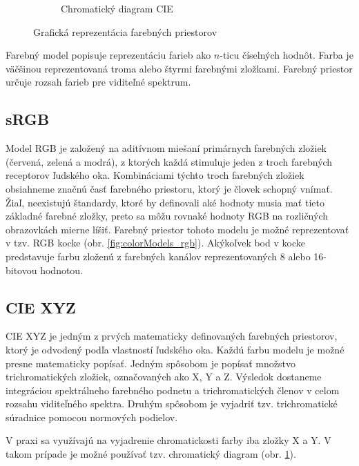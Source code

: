 \begin{figure}[t]
\begin{subfigure}{0.35\textwidth}
        \caption{Chromatický diagram CIE}
        \label{fig:colorModels_cie}
    \end{subfigure}
    \caption{Grafická reprezentácia farebných priestorov \cite{AHDR}}
    \label{fig:colorModels}
\end{figure}

Farebný model popisuje reprezentáciu farieb ako $n$-ticu číselných hodnôt. Farba je väčšinou reprezentovaná troma alebo štyrmi farebnými
zložkami. Farebný priestor určuje rozsah farieb pre viditeľné spektrum.

\subsection*{sRGB}

Model RGB je založený na aditívnom miešaní primárnych farebných zložiek (červená, zelená a modrá), z ktorých každá stimuluje jeden z troch
farebných receptorov ľudského oka. Kombináciami týchto troch farebných zložiek obsiahneme značnú časť farebného priestoru, ktorý je človek
schopný vnímať. Žiaľ, neexistujú štandardy, ktoré by definovali aké hodnoty musia mať tieto základné farebné zložky, preto sa môžu rovnaké
hodnoty RGB na rozličných obrazovkách mierne líšiť. Farebný priestor tohoto modelu je možné reprezentovať v tzv. RGB kocke (obr.
\ref{fig:colorModels_rgb}). Akýkoľvek bod v kocke predstavuje farbu zloženú z farebných kanálov reprezentovaných 8 alebo 16-bitovou hodnotou.

\subsection*{CIE XYZ}

CIE XYZ je jedným z prvých matematicky definovaných farebných priestorov, ktorý je odvodený podľa vlastností ľudského oka. Každú farbu modelu
je možné presne matematicky popísať. Jedným spôsobom je popísať množstvo trichromatických zložiek, označovaných ako X, Y a Z. Výsledok dostaneme
integráciou spektrálneho farebného podnetu a trichromatických členov v celom rozsahu viditeľného spektra. Druhým spôsobom je vyjadriť 
tzv. trichromatické súradnice pomocou normových podielov.

V praxi sa využívajú na vyjadrenie chromatickosti farby iba zložky X a Y. V takom prípade je možné používať tzv. chromatický diagram (obr.
\ref{fig:colorModels_cie}).
